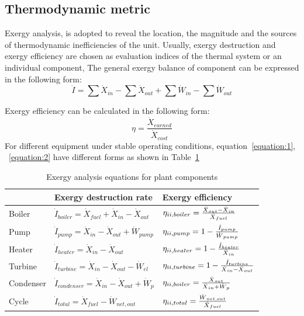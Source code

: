 \documentclass[preprint,12pt]{elsarticle}
\begin{document}
\subsection{Thermodynamic metric} %
\label{ssub3:analsys method} 
Exergy analysis, is adopted to reveal the location, the magnitude and the sources of thermodynamic inefficiencies of the unit.
Usually, exergy destruction and exergy efficiency are chosen as evaluation indices of the thermal system or an individual component, 
The general exergy balance of component can be expressed in the following form:
\begin{equation}
\label{equation:1}
\dot{I}=\sum\dot{X}{}_{in}-\sum\dot{X}{}_{out}+\sum\dot{W}{}_{in}-\sum\dot{W}{}_{out}
\end{equation}





Exergy efficiency can be calculated in the following form:
\begin{equation}
\label{equation:2}
\eta=\frac{\dot{X}{}_{earned}}{\dot{X}{}_{cost}}
\end{equation}
For different equipment under stable operating conditions, equation~\ref{equation:1}, ~\ref{equation:2} have different forms as shown in Table~\ref{tab:exergy equation}~\cite{Aljundi2009Energy}

\begin{table}
\caption{Exergy analysis equations for plant components}
\label{tab:exergy equation}
\centering
\begin{tabular}{lll}
\toprule 
 & Exergy destruction rate  & Exergy efficiency\tabularnewline
\midrule
Boiler & $\dot{I}_{boiler}=\dot{X}{}_{fuel}+\dot{X}{}_{in}-\dot{X}{}_{out}$ & $\eta_{\uppercase\expandafter{\romannumeral2},boiler}=\frac{\dot{X}{}_{out}-\dot{X}{}_{in}}{\dot{X}{}_{fuel}}$\tabularnewline
Pump & $\dot{I}_{pump}=\dot{X}{}_{in}-\dot{X}{}_{out}+\dot{W}{}_{pump}$ & $\eta_{\uppercase\expandafter{\romannumeral2},pump}=1-\frac{\dot{I}_{pump}}{\dot{W}{}_{pump}}$\tabularnewline
Heater & $\dot{I}_{heater}=\dot{X}{}_{in}-\dot{X}{}_{out}$ & $\eta_{\uppercase\expandafter{\romannumeral2},heater}=1-\frac{\dot{I}_{heater}}{\dot{X}{}_{in}}$\tabularnewline
Turbine & $\dot{I}_{turbine}=\dot{X}{}_{in}-\dot{X}{}_{out}-\dot{W}{}_{el}$ & $\eta_{\uppercase\expandafter{\romannumeral2},turbine}=1-\frac{\dot{I}_{turbine}}{\dot{X}{}_{in}-\dot{X}{}_{out}}$\tabularnewline
Condenser & $\dot{I}_{condenser}=\dot{X}{}_{in}-\dot{X}{}_{out}+\dot{W}{}_{p}$ & $\eta_{\uppercase\expandafter{\romannumeral2},boiler}=\frac{\dot{X}{}_{out}}{\dot{X}{}_{in}+\dot{W}{}_{p}}$\tabularnewline
Cycle &$\dot{I}_{total}=\dot{X}{}_{fuel}-\dot{W}{}_{net,out}$ & $\eta_{\uppercase\expandafter{\romannumeral2},total}=\frac{\dot{W}{}_{net,out}}{\dot{X}{}_{fuel}}$\tabularnewline
\bottomrule
\end{tabular}
\end{table}
\end{document}
